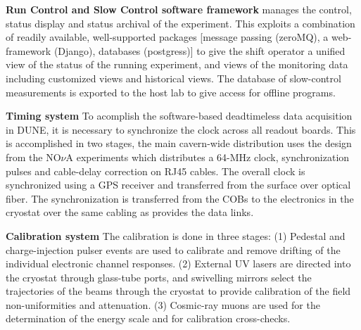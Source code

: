 {\bf Run Control and Slow Control software framework} manages the
control, status display and status archival of the experiment.  This
exploits a combination of readily available, well-supported packages
[message passing (zeroMQ), a web-framework (Django), databases
(postgress)] to give the shift operator a unified view of the status
of the running experiment, and views of the monitoring data including
customized views and historical views.  The database of slow-control
measurements is exported to the host lab to give access for offline
programs.

{\bf Timing system} To acomplish the software-based deadtimeless data
acquisition in DUNE, it is necessary to synchronize the clock across
all readout boards.  This is accomplished in two stages, the main
cavern-wide distribution uses the design from the NO$\nu$A experiments
which distributes a 64-MHz clock, synchronization pulses and
cable-delay correction on RJ45 cables.  The overall clock is
synchronized using a GPS receiver and transferred from the surface
over optical fiber.  The synchronization is transferred from the COBs
to the electronics in the cryostat over the same cabling as provides
the data links.

{\bf Calibration system} The calibration is done in three stages: (1)
Pedestal and charge-injection pulser events are used to calibrate and
remove drifting of the individual electronic channel responses. (2)
External UV lasers are directed into the cryostat through glass-tube
ports, and swivelling mirrors select the trajectories of the beams
through the cryostat to provide calibration of the field
non-uniformities and attenuation. (3) Cosmic-ray muons are used for
the determination of the energy scale and for calibration
cross-checks.

